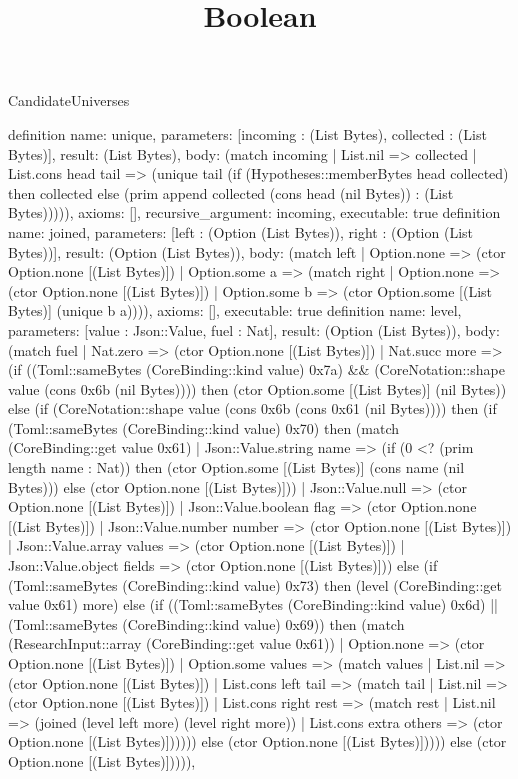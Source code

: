 \begin{lexlean}{CandidateUniverses}
\title{Boolean}
\begin{semanticmodule}
definition{
 name: unique,
 parameters: [incoming : (List Bytes), collected : (List Bytes)],
 result: (List Bytes),
 body: (match incoming | List.nil => collected | List.cons head tail => (unique tail (if (Hypotheses::memberBytes head collected) then collected else (prim append collected (cons head (nil Bytes)) : (List Bytes))))),
 axioms: [],
 recursive_argument: incoming,
 executable: true
}
definition{
 name: joined,
 parameters: [left : (Option (List Bytes)), right : (Option (List Bytes))],
 result: (Option (List Bytes)),
 body: (match left | Option.none => (ctor Option.none [(List Bytes)]) | Option.some a => (match right | Option.none => (ctor Option.none [(List Bytes)]) | Option.some b => (ctor Option.some [(List Bytes)] (unique b a)))),
 axioms: [],
 executable: true
}
definition{
 name: level,
 parameters: [value : Json::Value, fuel : Nat],
 result: (Option (List Bytes)),
 body: (match fuel | Nat.zero => (ctor Option.none [(List Bytes)]) | Nat.succ more => (if ((Toml::sameBytes (CoreBinding::kind value) 0x7a) && (CoreNotation::shape value (cons 0x6b (nil Bytes)))) then (ctor Option.some [(List Bytes)] (nil Bytes)) else (if (CoreNotation::shape value (cons 0x6b (cons 0x61 (nil Bytes)))) then (if (Toml::sameBytes (CoreBinding::kind value) 0x70) then (match (CoreBinding::get value 0x61) | Json::Value.string name => (if (0 <? (prim length name : Nat)) then (ctor Option.some [(List Bytes)] (cons name (nil Bytes))) else (ctor Option.none [(List Bytes)])) | Json::Value.null => (ctor Option.none [(List Bytes)]) | Json::Value.boolean flag => (ctor Option.none [(List Bytes)]) | Json::Value.number number => (ctor Option.none [(List Bytes)]) | Json::Value.array values => (ctor Option.none [(List Bytes)]) | Json::Value.object fields => (ctor Option.none [(List Bytes)])) else (if (Toml::sameBytes (CoreBinding::kind value) 0x73) then (level (CoreBinding::get value 0x61) more) else (if ((Toml::sameBytes (CoreBinding::kind value) 0x6d) || (Toml::sameBytes (CoreBinding::kind value) 0x69)) then (match (ResearchInput::array (CoreBinding::get value 0x61)) | Option.none => (ctor Option.none [(List Bytes)]) | Option.some values => (match values | List.nil => (ctor Option.none [(List Bytes)]) | List.cons left tail => (match tail | List.nil => (ctor Option.none [(List Bytes)]) | List.cons right rest => (match rest | List.nil => (joined (level left more) (level right more)) | List.cons extra others => (ctor Option.none [(List Bytes)]))))) else (ctor Option.none [(List Bytes)])))) else (ctor Option.none [(List Bytes)])))),
}
\end{semanticmodule}
\end{lexlean}
